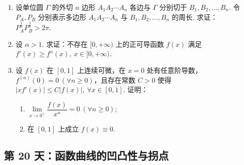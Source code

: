 \newpage

\begin{enumerate}[label=\textbf{\arabic*.}, itemsep=6cm, resume]
    \item 设单位圆 $\Gamma$ 的外切 $n$ 边形 $A_1A_2\cdots A_n$ 各边与 $\Gamma$ 分别切于 $B_1,B_2,\dots,B_n$. 令 $P_A,P_B$ 分别表示多边形 $A_1A_2\cdots A_n$ 与 $B_1,B_2,\dots,B_n$ 的周长. 求证：
    $ P_A^{\frac{1}{3}}P_B^{\frac{2}{3}}>2\pi. $
    
    \item 设 $\alpha>1$. 求证：不存在 $[0,+\infty)$ 上的正可导函数 $f(x)$ 满足
    $ f'(x)\ge f^\alpha(x),\ x\in[0,+\infty). $
    
    \item 设 $f(x)$ 在 $[0,1]$ 上连续可微，在 $x=0$ 处有任意阶导数，$f^{(n)}(0)=0\ (\forall n\ge0)$，且存在常数 $C>0$ 使得
    $ |xf'(x)|\le C|f(x)|,\ \forall x\in[0,1]. $
    证明：
    \begin{enumerate}[label=(\arabic*)]
        \item $\lim\limits_{x\to0^+}\dfrac{f(x)}{x^n}=0\ (\forall n\ge0)$;
        \item 在 $[0,1]$ 上成立 $f(x)\equiv0$.
    \end{enumerate}
\end{enumerate}

\newpage

\subsection*{第 20 天：函数曲线的凹凸性与拐点}
\vspace{1cm}

